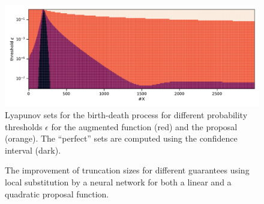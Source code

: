\begin{figure}[htb]
\centering
\includegraphics[width=\textwidth]{gfx/lya_sets.pdf}
	\caption[Augmented v.\ proposal Lyapunov sets]{\label{fig:lya_sets}Lyapunov sets for the birth-death process for different probability thresholds $\epsilon$ for the augmented function (red) and the proposal (orange). The ``perfect'' sets are computed using the confidence interval (dark).}
\end{figure}
\begin{figure}[htb]
	\centering
    \caption[Truncation size improvement]{\label{fig:improvement}The improvement of truncation sizes for different guarantees using local substitution by a neural network for both a linear and a quadratic proposal function.}
\end{figure}


